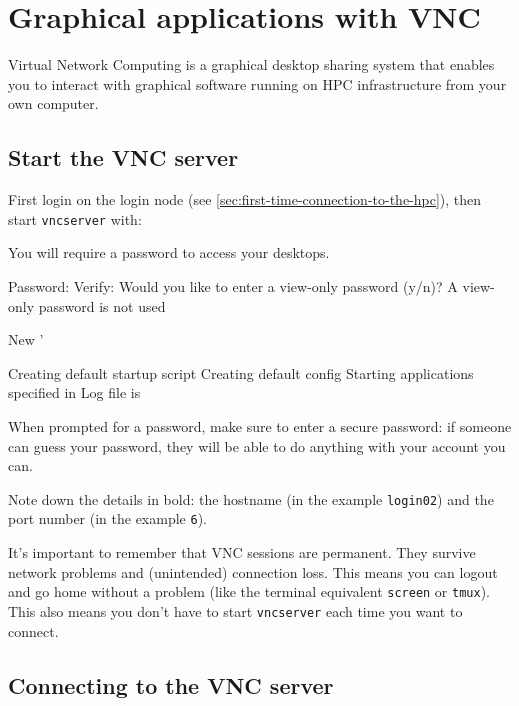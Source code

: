 \chapter{Graphical applications with VNC}
\label{ch:vnc}

Virtual Network Computing is a graphical desktop sharing system that enables you
to interact with graphical software running on HPC infrastructure from your own
computer.

\section{Start the VNC server}
\label{sec:start-vnc}

First login on the login node (see \autoref{sec:first-time-connection-to-the-hpc}),
then start \lstinline|vncserver| with:

\begin{prompt}
You will require a password to access your desktops.

Password:%
Verify:%
Would you like to enter a view-only password (y/n)? %
A view-only password is not used

New '%

Creating default startup script %
Creating default config %
Starting applications specified in %
Log file is %

\end{prompt}

When prompted for a password, make sure to enter a secure password: if someone
can guess your password, they will be able to do anything with your account you can.

Note down the details in bold: the hostname (in the example \lstinline|login02|)
and the port number (in the example \lstinline|6|).

It's important to remember that VNC sessions are permanent. They survive network
problems and (unintended) connection loss. This means you can logout and go home
without a problem (like the terminal equivalent \lstinline|screen| or \lstinline|tmux|).
This also means you don't have to start \lstinline|vncserver| each time you want to connect.

\section{Connecting to the VNC server}

